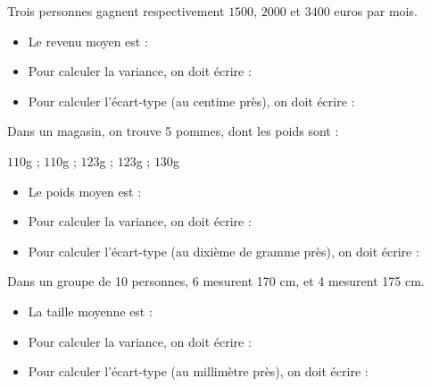 \documentclass{beamer}
\begin{document}
\begin{frame}
	Trois personnes gagnent respectivement $1500$, $2000$ et $3400$ euros par mois.
	\begin{itemize}
		\item<2-> Le revenu moyen est : 
		\item<3-> Pour calculer la variance, on doit écrire :


		\item<4-> Pour calculer l'écart-type (au centime près), on doit écrire :

	\end{itemize}
\end{frame}

\begin{frame}
	Dans un magasin, on trouve 5 pommes, dont les poids sont :

	$110$g ; $110$g ; $123$g ; $123$g ; $130$g
	\begin{itemize}
		\item<2-> Le poids moyen est : 
		\item<3-> Pour calculer la variance, on doit écrire :


		\item<4-> Pour calculer l'écart-type (au dixième de gramme près), on doit écrire :

	\end{itemize}
\end{frame}

\begin{frame}
	Dans un groupe de 10 personnes, 6 mesurent 170 cm, et 4 mesurent 175 cm.
	\begin{itemize}
		\item<2-> La taille moyenne est : 
		\item<3-> Pour calculer la variance, on doit écrire :


		\item<4-> Pour calculer l'écart-type (au millimètre près), on doit écrire :

	\end{itemize}
\end{frame}
\end{document}
